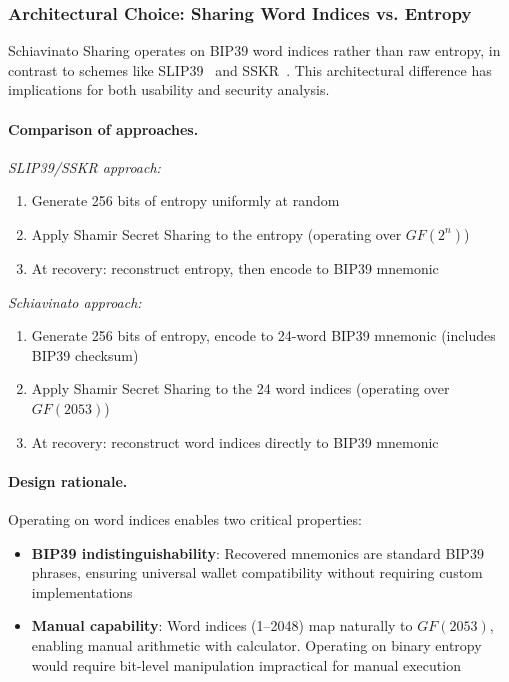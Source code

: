 \documentclass[11pt]{article}
\begin{document}
\subsubsection{Architectural Choice: Sharing Word Indices vs. Entropy}

Schiavinato Sharing operates on BIP39 word indices rather than raw entropy, in contrast to schemes like SLIP39~\cite{slip39} and SSKR~\cite{sskr}. This architectural difference has implications for both usability and security analysis.

\paragraph{Comparison of approaches.}

\textit{SLIP39/SSKR approach:}
\begin{enumerate}[noitemsep]
    \item Generate 256 bits of entropy uniformly at random
    \item Apply Shamir Secret Sharing to the entropy (operating over $GF(2^n)$)
    \item At recovery: reconstruct entropy, then encode to BIP39 mnemonic
\end{enumerate}

\textit{Schiavinato approach:}
\begin{enumerate}[noitemsep]
    \item Generate 256 bits of entropy, encode to 24-word BIP39 mnemonic (includes BIP39 checksum)
    \item Apply Shamir Secret Sharing to the 24 word indices (operating over $GF(2053)$)
    \item At recovery: reconstruct word indices directly to BIP39 mnemonic
\end{enumerate}

\paragraph{Design rationale.} Operating on word indices enables two critical properties:
\begin{itemize}[noitemsep]
    \item \textbf{BIP39 indistinguishability}: Recovered mnemonics are standard BIP39 phrases, ensuring universal wallet compatibility without requiring custom implementations
    \item \textbf{Manual capability}: Word indices (1--2048) map naturally to $GF(2053)$, enabling manual arithmetic with calculator. Operating on binary entropy would require bit-level manipulation impractical for manual execution
\end{itemize}
\end{document}
